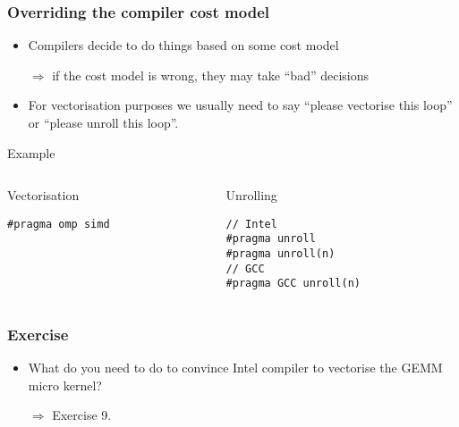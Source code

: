 \documentclass[presentation,aspectratio=43,10pt]{beamer}
\begin{document}
\begin{frame}[fragile]
  \frametitle{Overriding the compiler cost model}
  \begin{itemize}
  \item Compilers decide to do things based on some cost model
  \item[$\Rightarrow$] if the cost model is wrong, they may take
    ``bad'' decisions
  \item For vectorisation purposes we usually need to say ``please
    vectorise this loop'' or ``please unroll this loop''.
  \end{itemize}
  \begin{exampleblock}{Example}
    \vspace{0.5\baselineskip}
    \begin{columns}[t]
      \begin{column}{0.45\textwidth}
        Vectorisation
\begin{verbatim}
#pragma omp simd
\end{verbatim}
      \end{column}
      \begin{column}{0.45\textwidth}
        Unrolling
\begin{verbatim}
// Intel
#pragma unroll
#pragma unroll(n)
// GCC
#pragma GCC unroll(n)
\end{verbatim}
      \end{column}
    \end{columns}
  \end{exampleblock}
\end{frame}

\begin{frame}
  \frametitle{Exercise}
  \begin{itemize}
  \item What do you need to do to convince Intel compiler to vectorise the
    GEMM micro kernel?
  \item[$\Rightarrow$] Exercise 9.
  \end{itemize}
\end{frame}
\end{document}
